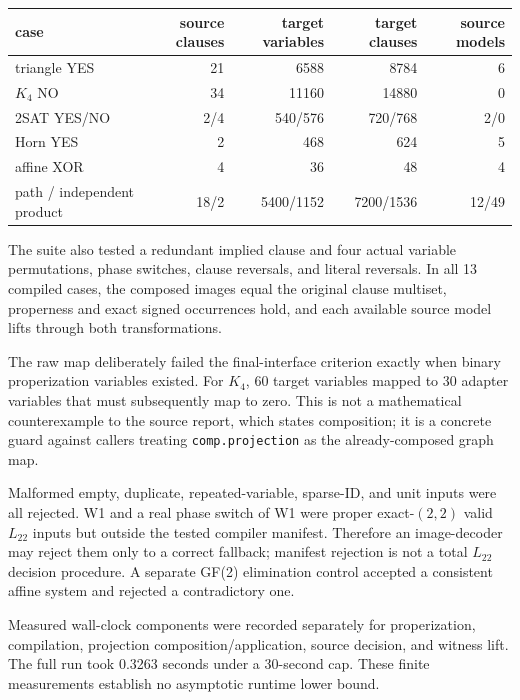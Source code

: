 \documentclass[11pt]{article}
\begin{document}
\begin{center}
\begin{tabular}{lrrrr}
\toprule
case & source clauses & target variables & target clauses & source models\\
\midrule
triangle YES & 21 & 6588 & 8784 & 6\\
$K_4$ NO & 34 & 11160 & 14880 & 0\\
2SAT YES/NO & 2/4 & 540/576 & 720/768 & 2/0\\
Horn YES & 2 & 468 & 624 & 5\\
affine XOR & 4 & 36 & 48 & 4\\
path / independent product & 18/2 & 5400/1152 & 7200/1536 & 12/49\\
\bottomrule
\end{tabular}
\end{center}

The suite also tested a redundant implied clause and four actual variable
permutations, phase switches, clause reversals, and literal reversals.  In all
13 compiled cases, the composed images equal the original clause multiset,
properness and exact signed occurrences hold, and each available source model
lifts through both transformations.

The raw map deliberately failed the final-interface criterion exactly when
binary properization variables existed.  For $K_4$, 60 target variables mapped
to 30 adapter variables that must subsequently map to zero.  This is not a
mathematical counterexample to the source report, which states composition; it
is a concrete guard against callers treating \texttt{comp.projection} as the
already-composed graph map.

Malformed empty, duplicate, repeated-variable, sparse-ID, and unit inputs were
all rejected.  W1 and a real phase switch of W1 were proper exact-$(2,2)$ valid
$L_{22}$ inputs but outside the tested compiler manifest.  Therefore an
image-decoder may reject them only to a correct fallback; manifest rejection
is not a total $L_{22}$ decision procedure.  A separate GF(2) elimination
control accepted a consistent affine system and rejected a contradictory one.

Measured wall-clock components were recorded separately for properization,
compilation, projection composition/application, source decision, and witness
lift.  The full run took 0.3263 seconds under a 30-second cap.  These finite
measurements establish no asymptotic runtime lower bound.
\end{document}

